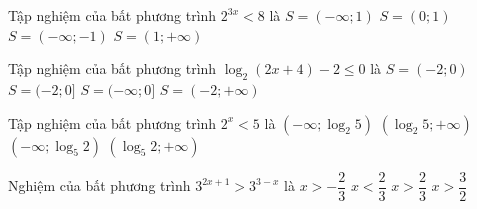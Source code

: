 \begin{ex}%
	Tập nghiệm của bất  phương trình $2^{3x}<8$ là
	\choice 
		 {\True$S=\left(-\infty; 1\right)$}
		 {$S=\left(0;1\right)$}
		{$S=\left(-\infty;-1\right)$} 
		 {$S=\left(1;+\infty\right)$}
\end{ex}

\begin{ex}%
	Tập nghiệm của bất phương  trình $\log_2(2x+4)-2\le 0$ là
	 \choice
		{\True $S=(-2;0)$} 
		 {$S=(-2;0]$}
		 {$S=(-\infty;0]$}
		 {$S=(-2;+\infty) $}
\end{ex}

\begin{ex}%
	 Tập nghiệm của bất phương trình $2^x<5$ là
	\choice 
		{\True $\left( -\infty;{\log }_2 5  \right)$}
		{$\left({\log  }_2 5;+\infty \right)$}
		{$\left( -\infty;{\log }_{5} 2  \right)$}
		 {$\left({\log }_{5} 2;+\infty \right)$}
\end{ex}

\begin{ex}%
	 Nghiệm của bất phương trình $3^{2x+1}>3^{3-x}$ là
	 \choice
		{$x>-\dfrac{2}{3}$} 
		{$x<\dfrac{2}{3}$} 
		 {\True $x>\dfrac{2}{3}$}
		{  $x>\dfrac{3}{2}$}
\end{ex}


